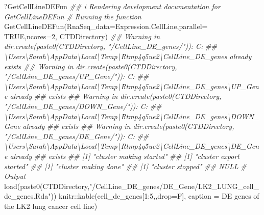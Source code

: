 \documentclass[]{article}
\newcommand{\hlnum}[1]{\textcolor[rgb]{0.816,0.125,0.439}{#1}}%
\newcommand{\hlstr}[1]{\textcolor[rgb]{0.251,0.627,0.251}{#1}}%
\newcommand{\hlcom}[1]{\textcolor[rgb]{0.502,0.502,0.502}{\textit{#1}}}%
\newcommand{\hlstd}[1]{\textcolor[rgb]{0.251,0.251,0.251}{#1}}%
\newenvironment{Shaded}{\begin{myshaded}}{\end{myshaded}}
\newcommand{\DecValTok}[1]{\hlnum{#1}}
\newcommand{\ConstantTok}[1]{\hlnum{#1}}
\newcommand{\SpecialCharTok}[1]{\hlstr{#1}}
\newcommand{\StringTok}[1]{\hlstr{#1}}
\newcommand{\CommentTok}[1]{\hlcom{#1}}
\newcommand{\DocumentationTok}[1]{\hlcom{#1}}
\newcommand{\FunctionTok}[1]{\hlstd{#1}}
\newcommand{\AttributeTok}[1]{{#1}}
\newcommand{\NormalTok}[1]{\hlstd{#1}}
\begin{document}
\begin{Shaded}
\begin{Highlighting}[]
\NormalTok{?GetCellLineDEFun}
\DocumentationTok{\#\# i Rendering development documentation for \textquotesingle{}GetCellLineDEFun\textquotesingle{}}
\CommentTok{\# Running the function}
\FunctionTok{GetCellLineDEFun}\NormalTok{(}\AttributeTok{RnaSeq\_data=}\NormalTok{Expression.CellLine,}\AttributeTok{parallel=} \ConstantTok{TRUE}\NormalTok{,}\AttributeTok{ncores=}\DecValTok{2}\NormalTok{, CTDDirectory)}
\DocumentationTok{\#\# Warning in dir.create(paste0(CTDDirectory, "/CellLine\_DE\_genes/")): \textquotesingle{}C:}
\DocumentationTok{\#\# \textbackslash{}Users\textbackslash{}Sarah\textbackslash{}AppData\textbackslash{}Local\textbackslash{}Temp\textbackslash{}Rtmp4q5ue2\textbackslash{}CellLine\_DE\_genes\textquotesingle{} already exists}
\DocumentationTok{\#\# Warning in dir.create(paste0(CTDDirectory, "/CellLine\_DE\_genes/UP\_Gene/")): \textquotesingle{}C:}
\DocumentationTok{\#\# \textbackslash{}Users\textbackslash{}Sarah\textbackslash{}AppData\textbackslash{}Local\textbackslash{}Temp\textbackslash{}Rtmp4q5ue2\textbackslash{}CellLine\_DE\_genes\textbackslash{}UP\_Gene\textquotesingle{} already}
\DocumentationTok{\#\# exists}
\DocumentationTok{\#\# Warning in dir.create(paste0(CTDDirectory, "/CellLine\_DE\_genes/DOWN\_Gene/")): \textquotesingle{}C:}
\DocumentationTok{\#\# \textbackslash{}Users\textbackslash{}Sarah\textbackslash{}AppData\textbackslash{}Local\textbackslash{}Temp\textbackslash{}Rtmp4q5ue2\textbackslash{}CellLine\_DE\_genes\textbackslash{}DOWN\_Gene\textquotesingle{} already}
\DocumentationTok{\#\# exists}
\DocumentationTok{\#\# Warning in dir.create(paste0(CTDDirectory, "/CellLine\_DE\_genes/DE\_Gene/")): \textquotesingle{}C:}
\DocumentationTok{\#\# \textbackslash{}Users\textbackslash{}Sarah\textbackslash{}AppData\textbackslash{}Local\textbackslash{}Temp\textbackslash{}Rtmp4q5ue2\textbackslash{}CellLine\_DE\_genes\textbackslash{}DE\_Gene\textquotesingle{} already}
\DocumentationTok{\#\# exists}
\DocumentationTok{\#\# [1] "cluster making started"}
\DocumentationTok{\#\# [1] "cluster export started"}
\DocumentationTok{\#\# [1] "cluster making done"}
\DocumentationTok{\#\# [1] "cluster stopped"}
\DocumentationTok{\#\# NULL}
\CommentTok{\# Output}
\FunctionTok{load}\NormalTok{(}\FunctionTok{paste0}\NormalTok{(CTDDirectory,}\StringTok{"/CellLine\_DE\_genes/DE\_Gene/LK2\_LUNG\_cell\_de\_genes.Rda"}\NormalTok{))}
\NormalTok{knitr}\SpecialCharTok{::}\FunctionTok{kable}\NormalTok{(cell\_de\_genes[}\DecValTok{1}\SpecialCharTok{:}\DecValTok{5}\NormalTok{,,}\AttributeTok{drop=}\NormalTok{F], }\AttributeTok{caption =} \StringTok{\textquotesingle{}DE genes of the LK2 lung cancer cell line\textquotesingle{}}\NormalTok{)}
\end{Highlighting}
\end{Shaded}
\end{document}
